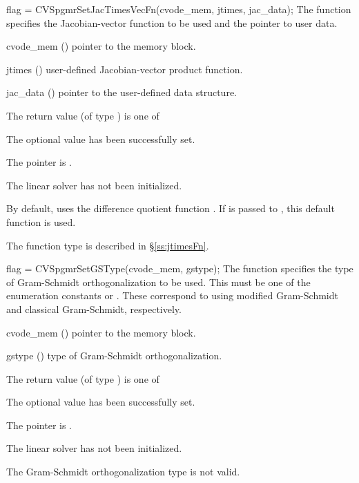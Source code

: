 {
  flag = CVSpgmrSetJacTimesVecFn(cvode\_mem, jtimes, jac\_data);
}
{
  The function  specifies the Jacobian-vector 
  function to be used and the pointer to user data.
}
{
  \begin{args}
  \item[cvode\_mem] ()
    pointer to the {\cvode} memory block.
  \item[jtimes] ()
    user-defined Jacobian-vector product function.
  \item[jac\_data] ()
     pointer to the user-defined data structure.
  \end{args}
}
{
  The return value  (of type ) is one of
  \begin{args}
  \item[\Id{CVSPGMR\_SUCCESS}] 
    The optional value has been successfully set.
  \item[\Id{CVSPGMR\_MEM\_NULL}]
    The  pointer is .
  \item[\Id{CVSPGMR\_LMEM\_NULL}]
    The {\cvspgmr} linear solver has not been initialized.
  \end{args}
}
{
  By default, {\cvspgmr} uses the difference quotient function .
  If  is passed to , this default function is used.

  The function type  is described in \S\ref{ss:jtimesFn}.
}
{
  flag = CVSpgmrSetGSType(cvode\_mem, gstype);
}
{
  The function  specifies the type of
  Gram-Schmidt orthogonalization to be used. 
  This must be one of the enumeration constants 
  or . These correspond to using modified Gram-Schmidt 
  and classical Gram-Schmidt, respectively. 
}
{
  \begin{args}
  \item[cvode\_mem] ()
    pointer to the {\cvodes} memory block.
  \item[gstype] ()
    type of Gram-Schmidt orthogonalization.
  \end{args}
}
{
  The return value  (of type ) is one of
  \begin{args}
  \item[\Id{CVSPGMR\_SUCCESS}] 
    The optional value has been successfully set.
  \item[\Id{CVSPGMR\_MEM\_NULL}]
    The  pointer is .
  \item[\Id{CVSPGMR\_LMEM\_NULL}]
    The {\cvspgmr} linear solver has not been initialized.
  \item[\Id{CVSPGMR\_ILL\_INPUT}]
    The Gram-Schmidt orthogonalization type  is not valid.
  \end{args}
}
